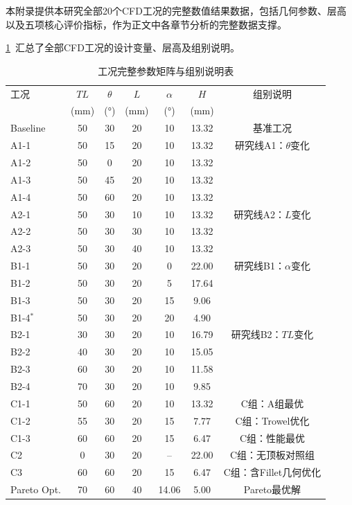 \label{sec:appendix-cfd-data}

本附录提供本研究全部20个CFD工况的完整数值结果数据，包括几何参数、层高以及五项核心评价指标，作为正文中各章节分析的完整数据支撑。


\cref{tab:appendix-case-params}~汇总了全部CFD工况的设计变量、层高及组别说明。

\begin{table}[!htb]
  \caption{工况完整参数矩阵与组别说明表}\label{tab:appendix-case-params}
  \centering
  \begin{tabular}{@{}lcccccc@{}}
    \toprule
    工况 & $TL$ & $\theta$ & $L$ & $\alpha$ & $H$ & 组别说明 \\
         & (mm) & (°)      & (mm) & (°)    & (mm) &          \\
    \midrule
    Baseline     & 50 & 30 & 20 & 10    & 13.32 & 基准工况 \\
    \midrule
    A1-1         & 50 & 15 & 20 & 10    & 13.32 & 研究线A1：$\theta$变化 \\
    A1-2         & 50 &  0 & 20 & 10    & 13.32 & \\
    A1-3         & 50 & 45 & 20 & 10    & 13.32 & \\
    A1-4         & 50 & 60 & 20 & 10    & 13.32 & \\
    \midrule
    A2-1         & 50 & 30 & 10 & 10    & 13.32 & 研究线A2：$L$变化 \\
    A2-2         & 50 & 30 & 30 & 10    & 13.32 & \\
    A2-3         & 50 & 30 & 40 & 10    & 13.32 & \\
    \midrule
    B1-1         & 50 & 30 & 20 &  0    & 22.00 & 研究线B1：$\alpha$变化 \\
    B1-2         & 50 & 30 & 20 &  5    & 17.64 & \\
    B1-3         & 50 & 30 & 20 & 15    &  9.06 & \\
    B1-4$^*$     & 50 & 30 & 20 & 20    &  4.90 & \\
    \midrule
    B2-1         & 30 & 30 & 20 & 10    & 16.79 & 研究线B2：$TL$变化 \\
    B2-2         & 40 & 30 & 20 & 10    & 15.05 & \\
    B2-3         & 60 & 30 & 20 & 10    & 11.58 & \\
    B2-4         & 70 & 30 & 20 & 10    &  9.85 & \\
    \midrule
    C1-1         & 50 & 60 & 20 & 10    & 13.32 & C组：A组最优 \\
    C1-2         & 55 & 30 & 20 & 15    &  7.77 & C组：Trowel优化 \\
    C1-3         & 60 & 60 & 20 & 15    &  6.47 & C组：性能最优 \\
    C2           &  0 & 30 & 20 & --    & 22.00 & C组：无顶板对照组 \\
    C3           & 60 & 60 & 20 & 15    &  6.47 & C组：含Fillet几何优化 \\
    \midrule
    Pareto Opt.  & 70 & 60 & 40 & 14.06 &  5.00 & Pareto最优解 \\
    \bottomrule
  \end{tabular}


\end{table}
